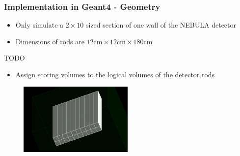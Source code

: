 \begin{frame}
\frametitle{Implementation in Geant4 - Geometry}

\begin{exampleblock}{}
	\begin{itemize}
		\item Only simulate a $2 \times 10$ sized section of one wall of the NEBULA detector
		\item Dimensions of rods are $12\text{cm} \times 12\text{cm} \times 180\text{cm}$
	\end{itemize}
\end{exampleblock}

\begin{alertblock}{TODO}
	\begin{itemize}
		\item Assign scoring volumes to the logical volumes of the detector rods
	\end{itemize}
\end{alertblock}

\begin{figure}
	\includegraphics[width=0.5\textwidth]{images/nebula.png}
\end{figure}

\end{frame}